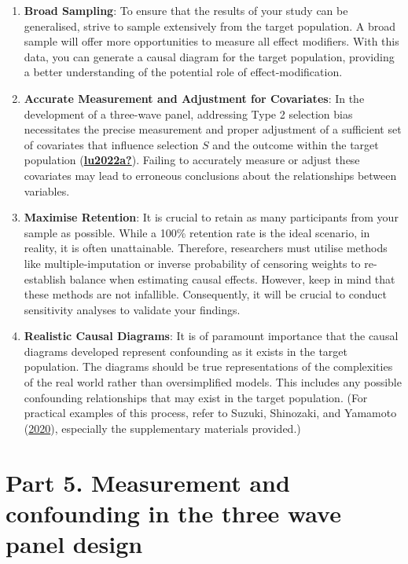 \documentclass[
  singlecolumn]{report}
\begin{document}
\begin{enumerate}
\def\labelenumi{\arabic{enumi}.}
\item
  \textbf{Broad Sampling}: To ensure that the results of your study can
  be generalised, strive to sample extensively from the target
  population. A broad sample will offer more opportunities to measure
  all effect modifiers. With this data, you can generate a causal
  diagram for the target population, providing a better understanding of
  the potential role of effect-modification.
\item
  \textbf{Accurate Measurement and Adjustment for Covariates}: In the
  development of a three-wave panel, addressing Type 2 selection bias
  necessitates the precise measurement and proper adjustment of a
  sufficient set of covariates that influence selection \(S\) and the
  outcome within the target population
  (\protect\hyperlink{ref-lu2022a}{\textbf{lu2022a?}}). Failing to
  accurately measure or adjust these covariates may lead to erroneous
  conclusions about the relationships between variables.
\item
  \textbf{Maximise Retention}: It is crucial to retain as many
  participants from your sample as possible. While a 100\% retention
  rate is the ideal scenario, in reality, it is often unattainable.
  Therefore, researchers must utilise methods like multiple-imputation
  or inverse probability of censoring weights to re-establish balance
  when estimating causal effects. However, keep in mind that these
  methods are not infallible. Consequently, it will be crucial to
  conduct sensitivity analyses to validate your findings.
\item
  \textbf{Realistic Causal Diagrams}: It is of paramount importance that
  the causal diagrams developed represent confounding as it exists in
  the target population. The diagrams should be true representations of
  the complexities of the real world rather than oversimplified models.
  This includes any possible confounding relationships that may exist in
  the target population. (For practical examples of this process, refer
  to Suzuki, Shinozaki, and Yamamoto
  (\protect\hyperlink{ref-suzuki2020}{2020}), especially the
  supplementary materials provided.)
\end{enumerate}

\hypertarget{part-5.-measurement-and-confounding-in-the-three-wave-panel-design}{%
\section{Part 5. Measurement and confounding in the three wave panel
design}\label{part-5.-measurement-and-confounding-in-the-three-wave-panel-design}}
\end{document}
